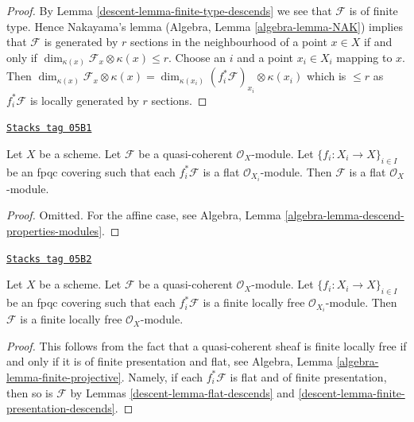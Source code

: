 \begin{proof}

By Lemma \ref{descent-lemma-finite-type-descends} we see that $\mathcal{F}$
is of finite type. Hence Nakayama's lemma
(Algebra, Lemma \ref{algebra-lemma-NAK}) implies that $\mathcal{F}$
is generated by $r$ sections in the neighbourhood of a point $x \in X$
if and only if $\dim_{\kappa(x)} \mathcal{F}_x \otimes \kappa(x) \leq r$.
Choose an $i$ and a point $x_i \in X_i$ mapping to $x$. Then
$\dim_{\kappa(x)} \mathcal{F}_x \otimes \kappa(x) =
\dim_{\kappa(x_i)} (f_i^*\mathcal{F})_{x_i} \otimes \kappa(x_i)$
which is $\leq r$ as $f_i^*\mathcal{F}$ is locally generated by $r$
sections.
\end{proof}

\begin{lemma}
\label{descent-lemma-flat-descends}
\href{https://stacks.math.columbia.edu/tag/05B1}{\texttt{Stacks tag 05B1}}

Let $X$ be a scheme.
Let $\mathcal{F}$ be a quasi-coherent $\mathcal{O}_X$-module.
Let $\{f_i : X_i \to X\}_{i \in I}$ be an fpqc covering such that
each $f_i^*\mathcal{F}$ is a flat $\mathcal{O}_{X_i}$-module.
Then $\mathcal{F}$ is a flat $\mathcal{O}_X$-module.
\end{lemma}

\begin{proof}
Omitted. For the affine case, see
Algebra, Lemma \ref{algebra-lemma-descend-properties-modules}.
\end{proof}

\begin{lemma}
\label{descent-lemma-finite-locally-free-descends}
\href{https://stacks.math.columbia.edu/tag/05B2}{\texttt{Stacks tag 05B2}}

Let $X$ be a scheme.
Let $\mathcal{F}$ be a quasi-coherent $\mathcal{O}_X$-module.
Let $\{f_i : X_i \to X\}_{i \in I}$ be an fpqc covering such that
each $f_i^*\mathcal{F}$ is a finite locally free $\mathcal{O}_{X_i}$-module.
Then $\mathcal{F}$ is a finite locally free $\mathcal{O}_X$-module.
\end{lemma}

\begin{proof}

This follows from the fact that a quasi-coherent sheaf is finite locally
free if and only if it is of finite presentation and flat, see
Algebra, Lemma \ref{algebra-lemma-finite-projective}.
Namely, if each $f_i^*\mathcal{F}$ is flat and of finite presentation,
then so is $\mathcal{F}$ by
Lemmas \ref{descent-lemma-flat-descends} and
\ref{descent-lemma-finite-presentation-descends}.
\end{proof}


